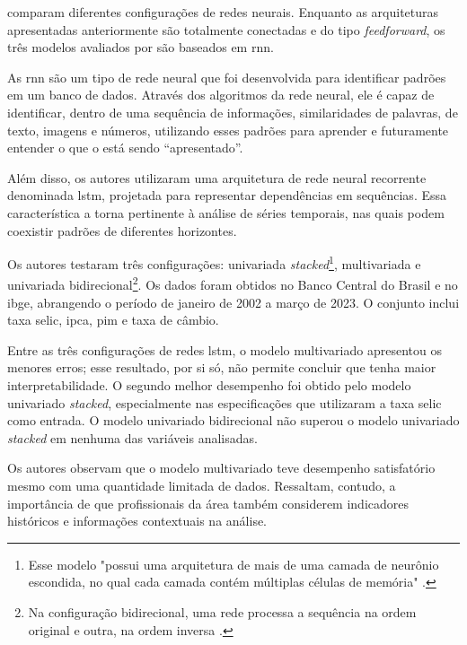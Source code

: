  comparam diferentes configurações de redes neurais. Enquanto as arquiteturas apresentadas anteriormente são totalmente conectadas e do tipo \textit{feedforward}, os três modelos avaliados por  são baseados em \ac{rnn}.

\begin{citacao}
	As \ac{rnn} são um tipo de rede neural que foi 
	desenvolvida para identificar padrões em um banco de dados. Através dos algoritmos da rede neural, ele é capaz de identificar, dentro de uma sequência de informações, similaridades de palavras, de texto, imagens e números, utilizando esses padrões para aprender e futuramente entender o que o está sendo “apresentado”. 
\end{citacao}

Além disso, os autores utilizaram uma arquitetura de rede neural recorrente denominada \ac{lstm}, projetada para representar dependências em sequências. Essa característica a torna pertinente à análise de séries temporais, nas quais podem coexistir padrões de diferentes horizontes.

Os autores testaram três configurações: univariada \textit{stacked}\footnote{Esse modelo "possui uma arquitetura de mais de uma camada de neurônio escondida, no qual cada camada contém múltiplas células de memória" .}, multivariada e univariada bidirecional\footnote{Na configuração bidirecional, uma rede processa a sequência na ordem original e outra, na ordem inversa .}. Os dados foram obtidos no Banco Central do Brasil e no \ac{ibge}, abrangendo o período de janeiro de 2002 a março de 2023. O conjunto inclui taxa \ac{selic}, \ac{ipca}, \ac{pim} e taxa de câmbio.

Entre as três configurações de redes \ac{lstm}, o modelo multivariado apresentou os menores erros; esse resultado, por si só, não permite concluir que tenha maior interpretabilidade. O segundo melhor desempenho foi obtido pelo modelo univariado \textit{stacked}, especialmente nas especificações que utilizaram a taxa \ac{selic} como entrada. O modelo univariado bidirecional não superou o modelo univariado \textit{stacked} em nenhuma das variáveis analisadas.

Os autores observam que o modelo multivariado teve desempenho satisfatório mesmo com uma quantidade limitada de dados. Ressaltam, contudo, a importância de que profissionais da área também considerem indicadores históricos e informações contextuais na análise.

